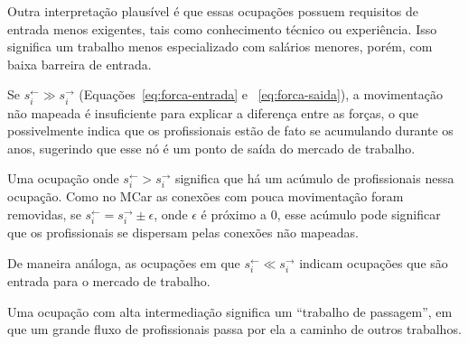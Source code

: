 \documentclass[12pt,a4paper,final]{article}
\newcommand{\linkin}[1]{#1^\leftarrow} %
\newcommand{\linkout}[1]{#1^\rightarrow} %
\begin{document}
Outra interpretação plausível é que essas ocupações possuem requisitos de entrada menos exigentes, tais como conhecimento técnico ou experiência. Isso significa um trabalho menos especializado com salários menores, porém, com baixa barreira de entrada.

\begin{hypothesis}
    Se $\linkin{s}_i \gg \linkout{s}_i$ (Equações~\ref{eq:forca-entrada} e ~\ref{eq:forca-saida}), a movimentação não mapeada é insuficiente para explicar a diferença entre as forças, o que possivelmente indica que os profissionais estão de fato se acumulando durante os anos, sugerindo que esse nó é um ponto de saída do mercado de trabalho.
\end{hypothesis}

Uma ocupação onde $\linkin{s}_i > \linkout{s}_i$ significa que há um acúmulo de profissionais nessa ocupação. Como no MCar as conexões com pouca movimentação foram removidas, se $\linkin{s}_i = \linkout{s}_i \pm \epsilon$, onde $\epsilon$ é próximo a 0, esse acúmulo pode significar que os profissionais se dispersam pelas conexões não mapeadas.

\begin{hypothesis}
    De maneira análoga, as ocupações em que $\linkin{s}_i \ll \linkout{s}_i$ indicam ocupações que são entrada para o mercado de trabalho.
\end{hypothesis}

\begin{hypothesis}
    Uma ocupação com alta intermediação significa um \enquote{trabalho de passagem}, em que um grande fluxo de profissionais passa por ela a caminho de outros trabalhos.
\end{hypothesis}
\end{document}
